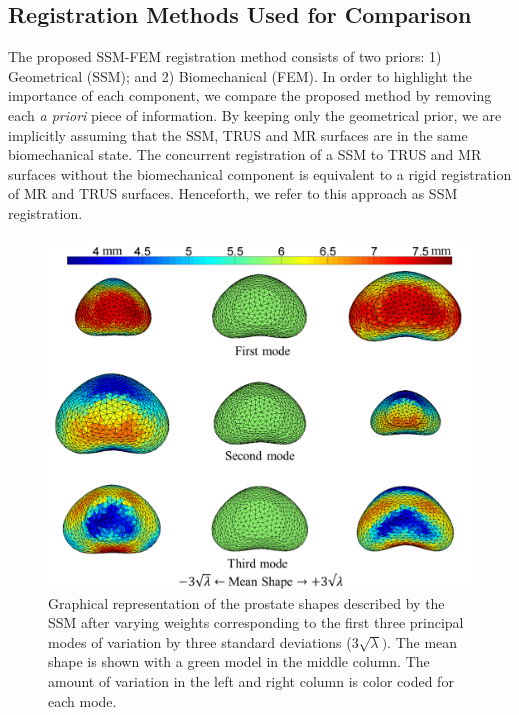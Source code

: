 \documentclass[journal]{IEEEtran}
\begin{document}
\subsection{Registration Methods Used for Comparison}
The proposed SSM-FEM registration method consists of two priors: 1) Geometrical (SSM); and 2) Biomechanical (FEM). In order to highlight the importance of each component, we compare the proposed method by removing each \textit{a priori} piece of information. By keeping only the geometrical prior, we are implicitly assuming that the SSM, TRUS and MR surfaces are in the same biomechanical state. The concurrent registration of a SSM to TRUS and MR surfaces without the biomechanical component is equivalent to a rigid registration of MR and TRUS surfaces. Henceforth, we refer to this approach as SSM registration.

\begin{figure}[t]
	\centering
	\includegraphics[width=\columnwidth]{images/SSM_modes_inferior}
	\caption{Graphical representation of the prostate shapes described by the SSM after varying weights corresponding to the first three principal modes of variation by three standard deviations ($3\sqrt{\lambda})$. The mean shape is shown with a green model in the middle column. The amount of variation in the left and right column is color coded for each mode.}\label{fig:SSM_modes}
\end{figure}
\end{document}
